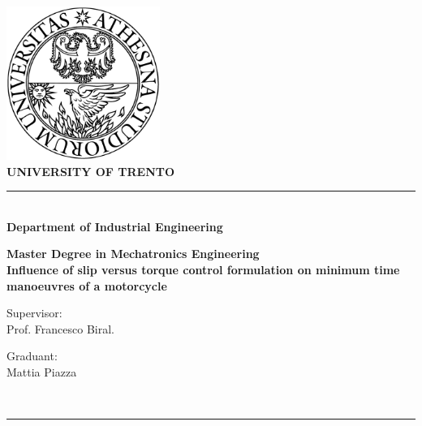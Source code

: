 \begin{titlepage}
\begin{center}
\includegraphics[width=5cm]{img/logo.png}\\[1cm]
{\LARGE \bfseries UNIVERSITY OF TRENTO \\[1cm]}


\rule{\linewidth}{0.3mm} \\[1cm]

{\LARGE \bfseries Department of Industrial Engineering\\[1cm]}

{ \Large \bfseries  Master Degree in Mechatronics Engineering\\[1.5cm] }
%
{ \Large \bfseries  Influence of slip versus torque control formulation on minimum time manoeuvres of a motorcycle \\[2cm] }

\end{center}


\begin{minipage}{0.5\linewidth}
Supervisor:\\
Prof. Francesco Biral.
\end{minipage}%
\begin{minipage}{0.5\linewidth}
\begin{flushright}
    Graduant:\\
    Mattia Piazza  
\end{flushright}


\end{minipage}
\\[0.5cm]


\vfill
\rule{\linewidth}{0.3mm} \\[0.5cm]
\end{titlepage}
%
\setcounter{page}{1}

\clearpage
\thispagestyle{empty}
\phantom{a}
\setcounter{page}{1}

